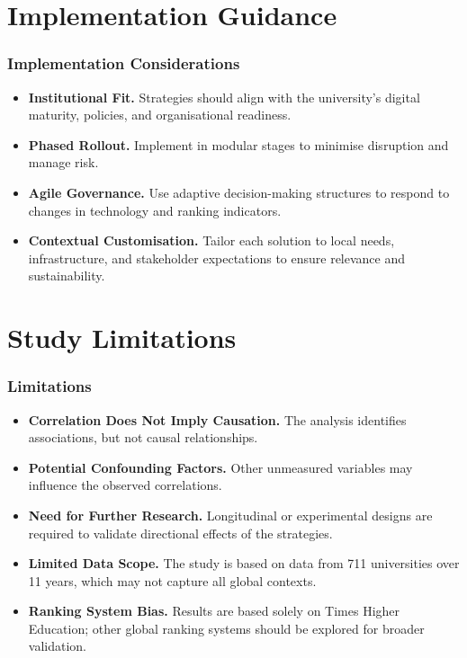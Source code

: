 \documentclass[aspectratio=169, table]{beamer}
\begin{document}
\section{Implementation Guidance}
\begin{frame}
	\vspace{20pt}
	\frametitle{Implementation Considerations}
	\begin{itemize}
		\item \textbf{Institutional Fit.} Strategies should align with the university’s digital maturity, policies, and organisational readiness.
		\item \textbf{Phased Rollout.} Implement in modular stages to minimise disruption and manage risk.
		\item \textbf{Agile Governance.} Use adaptive decision-making structures to respond to changes in technology and ranking indicators.
		\item \textbf{Contextual Customisation.} Tailor each solution to local needs, infrastructure, and stakeholder expectations to ensure relevance and sustainability.
	\end{itemize}
\end{frame}

\section{Study Limitations}
\begin{frame}
	\vspace{20pt}
	\frametitle{Limitations}
	\begin{itemize}
		\item \textbf{Correlation Does Not Imply Causation.} The analysis identifies associations, but not causal relationships.
		\item \textbf{Potential Confounding Factors.} Other unmeasured variables may influence the observed correlations.
		\item \textbf{Need for Further Research.} Longitudinal or experimental designs are required to validate directional effects of the strategies.
		\item \textbf{Limited Data Scope.} The study is based on data from 711 universities over 11 years, which may not capture all global contexts.
		\item \textbf{Ranking System Bias.} Results are based solely on Times Higher Education; other global ranking systems should be explored for broader validation.
	\end{itemize}
\end{frame}
\end{document}
